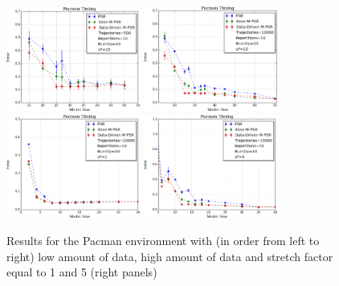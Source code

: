 \documentclass[letterpaper]{article}
\begin{document}
\begin{figure}[ht!]
%
\includegraphics[width=44mm]{Pacman500.png}%
%
%
\includegraphics[width=44mm]{Pacman10k.png}%
%
%
%
\includegraphics[width=44mm]{PacmanSF-1.png}%
%
\includegraphics[width=44mm]{PacmanSF-5.png}%
\caption{Results for the Pacman environment with (in order from left to right) low amount of data, high amount of data and stretch factor equal to 1 and 5 (right panels)\label{fig-pacsf5}%
}
\end{figure}
\end{document}
